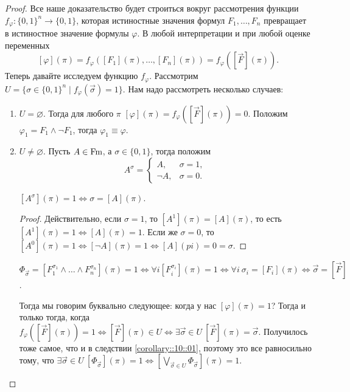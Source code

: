 \begin{proof}
    Все наше доказательство будет строиться вокруг рассмотрения функции $f_{\varphi} \colon \{0, 1\}^{n} \to \{0, 1\}$, которая истиностные значения формул $F_{1}, \ldots, F_{n}$ превращает в истиностное значение формулы $\varphi$.
    В любой интерпретации и при любой оценке переменных
    $$
        [\varphi](\pi) = f_{\varphi}([F_{1}](\pi), \ldots, [F_{n}](\pi)) = f_{\varphi}([\vec{F}](\pi)).
    $$
    Теперь давайте исследуем функцию $f_{\varphi}$.
    Рассмотрим $U = \{\sigma \in \{0, 1\}^{n} \mid f_{\varphi}(\vec{\sigma}) = 1\}$.
    Нам надо рассмотреть несколько случаев:
    \begin{enumerate}
        \item $U = \varnothing$.
        Тогда для любого $\pi$ $[\varphi](\pi) = f_{\varphi}([\vec{F}](\pi)) = 0$.
        Положим $\varphi_{1} = F_{1} \land \neg F_{1}$, тогда $\varphi_{1} \equiv \varphi$.
        \item $U \neq \varnothing$.
        Пусть $A \in \mathrm{Fm}$, а $\sigma \in \{0, 1\}$, тогда положим
        $$
            A^{\sigma} = \begin{cases}
                A, & \sigma = 1, \\
                \neg A, & \sigma = 0.
            \end{cases}
        $$
        \begin{statement}
            $[A^{\sigma}](\pi) = 1 \iff \sigma = [A](\pi)$.
        \end{statement}
        \begin{proof}
            Действительно, если $\sigma = 1$, то $[A^{1}](\pi) = [A](\pi)$, то есть $[A^{1}](\pi) = 1 \iff [A](\pi) = 1$.
            Если же $\sigma = 0$, то $[A^{0}](\pi) = 1 \iff [\neg A](\pi) = 1 \iff [A](pi) = 0 = \sigma$.
        \end{proof}
        \begin{corollary} \label{corollary::10::01}
            $\Phi_{\vec{\sigma}} = [F_{1}^{\sigma_{1}} \land \ldots \land F_{n}^{\sigma_{n}}](\pi) = 1 \iff \forall i [F_{i}^{\sigma_{i}}](\pi) = 1 \iff \forall i~\sigma_{i} = [F_{i}](\pi) \iff \vec{\sigma} = [\vec{F}]$.
        \end{corollary}
        Тогда мы говорим буквально следующее: когда у нас $[\varphi](\pi) = 1$?
        Тогда и только тогда, когда $f_{\varphi}([\vec{F}](\pi)) = 1 \iff [\vec{F}](\pi) \in U \iff \exists \vec{\sigma} \in U~ [\vec{F}](\pi) = \vec{\sigma}$.
        Получилось тоже самое, что и в следствии \ref{corollary::10::01}, поэтому это все равносильно тому, что $\exists \vec{\sigma} \in U~[\Phi_{\vec{\sigma}}](\pi) = 1 \iff [\bigvee\limits_{\vec{\sigma} \in U}\Phi_{\vec{\sigma}}](\pi) = 1$.

\end{enumerate}
\end{proof}
